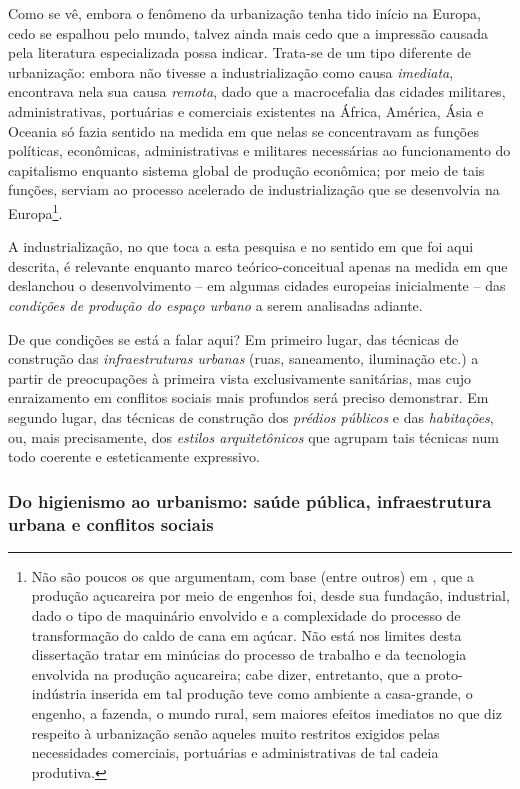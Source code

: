 Como se vê, embora o fenômeno da urbanização tenha tido início na Europa, cedo se espalhou pelo mundo, talvez ainda mais cedo que a impressão causada pela literatura especializada possa indicar. Trata-se de um tipo diferente de urbanização: embora não tivesse a industrialização como causa \textit{imediata}, encontrava nela sua causa \textit{remota}, dado que a macrocefalia das cidades militares, administrativas, portuárias e comerciais existentes na África, América, Ásia e Oceania só fazia sentido na medida em que nelas se concentravam as funções políticas, econômicas, administrativas e militares necessárias ao funcionamento do capitalismo enquanto sistema global de produção econômica; por meio de tais funções, serviam ao processo acelerado de industrialização que se desenvolvia na Europa\footnote{Não são poucos os que argumentam, com base (entre outros) em , que a produção açucareira por meio de engenhos foi, desde sua fundação, industrial, dado o tipo de maquinário envolvido e a complexidade do processo de transformação do caldo de cana em açúcar. Não está nos limites desta dissertação tratar em minúcias do processo de trabalho e da tecnologia envolvida na produção açucareira; cabe dizer, entretanto, que a proto-indústria inserida em tal produção teve como ambiente a casa-grande, o engenho, a fazenda, o mundo rural, sem maiores efeitos imediatos no que diz respeito à urbanização senão aqueles muito restritos exigidos pelas necessidades comerciais, portuárias e administrativas de tal cadeia produtiva.}. 

A industrialização, no que toca a esta pesquisa e no sentido em que foi aqui descrita, é relevante enquanto marco teórico-conceitual apenas na medida em que deslanchou o desenvolvimento -- em algumas cidades europeias inicialmente -- das \textit{condições de produção do espaço urbano} a serem analisadas adiante.

De que condições se está a falar aqui? Em primeiro lugar, das técnicas de construção das \textit{infraestruturas urbanas} (ruas, saneamento, iluminação etc.) a partir de preocupações à primeira vista exclusivamente sanitárias, mas cujo enraizamento em conflitos sociais mais profundos será preciso demonstrar. Em segundo lugar, das técnicas de construção dos \textit{prédios públicos} e das \textit{habitações}, ou, mais precisamente, dos \textit{estilos arquitetônicos} que agrupam tais técnicas num todo coerente e esteticamente expressivo.

\subsubsection{Do higienismo ao urbanismo: saúde pública, infraestrutura urbana e conflitos sociais}\label{subsubsec:higienurb}

